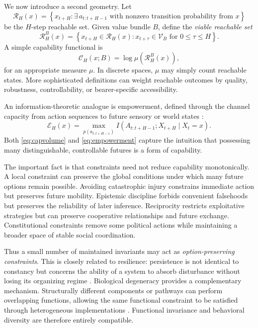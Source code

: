 \documentclass[11pt]{article}
\newcommand{\C}{\mathcal{C}}
\newcommand{\V}{\mathcal{V}}
\newcommand{\Reach}{\mathcal{R}}
\begin{document}
We now introduce a second geometry. Let
\begin{equation}
 \Reach_H(x)
 =
 \left\{
 x_{t+H}:
 \exists\,a_{t:t+H-1}
 \text{ with nonzero transition probability from }x
 \right\}
\end{equation}
be the $H$-step reachable set. Given value bundle $B$, define the \emph{viable reachable set}
\begin{equation}
 \Reach_H^{B}(x)
 =
 \left\{
 x_{t+H}\in\Reach_H(x):
 x_{t+\tau}\in\V_B
 \text{ for }0\leq\tau\leq H
 \right\}.
\end{equation}
A simple capability functional is
\begin{equation}
    \C_H(x;B)
    =
    \log \mu\!\left(\Reach_H^{B}(x)\right),
    \label{eq:capvolume}
\end{equation}
for an appropriate measure $\mu$. In discrete spaces, $\mu$ may simply count reachable states. More sophisticated definitions can weight reachable outcomes by quality, robustness, controllability, or bearer-specific accessibility.

An information-theoretic analogue is empowerment, defined through the channel capacity from action sequences to future sensory or world states \citep{KlyubinPolaniNehaniv2005}:
\begin{equation}
    \mathcal{E}_H(x)
    =
    \max_{p(a_{t:t+H-1})}
    I(A_{t:t+H-1};X_{t+H}\mid X_t=x).
    \label{eq:empowerment}
\end{equation}
Both \eqref{eq:capvolume} and \eqref{eq:empowerment} capture the intuition that possessing many distinguishable, controllable futures is a form of capability.

The important fact is that constraints need not reduce capability monotonically. A local constraint can preserve the global conditions under which many future options remain possible. Avoiding catastrophic injury constrains immediate action but preserves future mobility. Epistemic discipline forbids convenient falsehoods but preserves the reliability of later inference. Reciprocity restricts exploitative strategies but can preserve cooperative relationships and future exchange. Constitutional constraints remove some political actions while maintaining a broader space of stable social coordination.

Thus a small number of maintained invariants may act as \emph{option-preserving constraints}. This is closely related to resilience: persistence is not identical to constancy but concerns the ability of a system to absorb disturbance without losing its organizing regime \citep{Holling1973}. Biological degeneracy provides a complementary mechanism. Structurally different components or pathways can perform overlapping functions, allowing the same functional constraint to be satisfied through heterogeneous implementations \citep{EdelmanGally2001}. Functional invariance and behavioral diversity are therefore entirely compatible.
\end{document}
